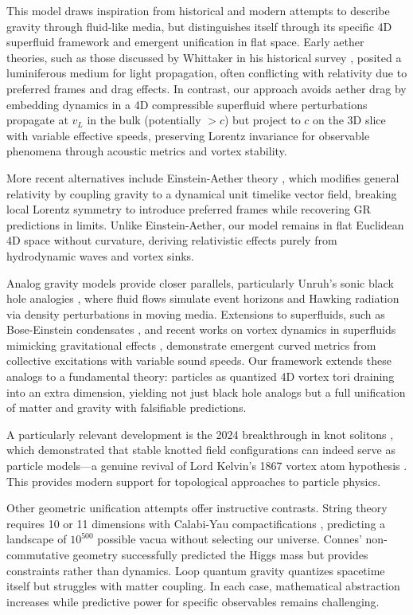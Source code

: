 This model draws inspiration from historical and modern attempts to describe gravity through fluid-like media, but distinguishes itself through its specific 4D superfluid framework and emergent unification in flat space. Early aether theories, such as those discussed by Whittaker in his historical survey \cite{whittaker1951history}, posited a luminiferous medium for light propagation, often conflicting with relativity due to preferred frames and drag effects. In contrast, our approach avoids aether drag by embedding dynamics in a 4D compressible superfluid where perturbations propagate at $v_L$ in the bulk (potentially $>c$) but project to $c$ on the 3D slice with variable effective speeds, preserving Lorentz invariance for observable phenomena through acoustic metrics and vortex stability.

More recent alternatives include Einstein-Aether theory \cite{jacobson2004einstein}, which modifies general relativity by coupling gravity to a dynamical unit timelike vector field, breaking local Lorentz symmetry to introduce preferred frames while recovering GR predictions in limits. Unlike Einstein-Aether, our model remains in flat Euclidean 4D space without curvature, deriving relativistic effects purely from hydrodynamic waves and vortex sinks.

Analog gravity models provide closer parallels, particularly Unruh's sonic black hole analogies \cite{unruh1981experimental}, where fluid flows simulate event horizons and Hawking radiation via density perturbations in moving media. Extensions to superfluids, such as Bose-Einstein condensates \cite{steinhauer2016hawking}, and recent works on vortex dynamics in superfluids mimicking gravitational effects \cite{svancara2024rotating}, demonstrate emergent curved metrics from collective excitations with variable sound speeds. Our framework extends these analogs to a fundamental theory: particles as quantized 4D vortex tori draining into an extra dimension, yielding not just black hole analogs but a full unification of matter and gravity with falsifiable predictions.

A particularly relevant development is the 2024 breakthrough in knot solitons \cite{eto2024knots}, which demonstrated that stable knotted field configurations can indeed serve as particle models---a genuine revival of Lord Kelvin's 1867 vortex atom hypothesis \cite{thomson1867vortex}. This provides modern support for topological approaches to particle physics.

Other geometric unification attempts offer instructive contrasts. String theory requires 10 or 11 dimensions with Calabi-Yau compactifications \cite{candelas1985vacuum}, predicting a landscape of $10^{500}$ possible vacua without selecting our universe. Connes' non-commutative geometry \cite{chamseddine2007gravity} successfully predicted the Higgs mass but provides constraints rather than dynamics. Loop quantum gravity \cite{ashtekar1986new} quantizes spacetime itself but struggles with matter coupling. In each case, mathematical abstraction increases while predictive power for specific observables remains challenging.

